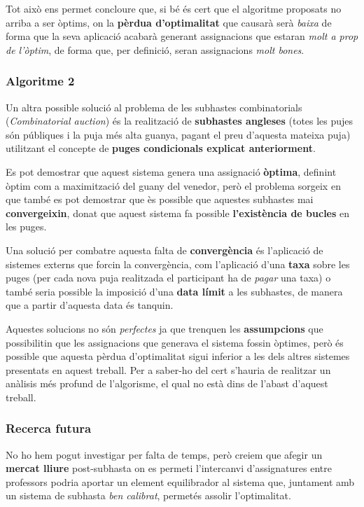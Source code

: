 \documentclass[10pt,twocolumn]{article}
\begin{document}
Tot això ens permet concloure que, si bé és cert que el algoritme proposats no arriba a ser òptims, on la \textbf{pèrdua d'optimalitat} que causarà serà \textit{baixa} de forma que la seva aplicació acabarà generant assignacions que estaran \textit{molt a prop de l'òptim}, de forma que, per definició, seran assignacions \textit{molt bones}.

\subsubsection{Algoritme 2}
Un altra possible solució al problema de les subhastes combinatorials (\textit{Combinatorial auction}) és la realització de \textbf{subhastes angleses} (totes les pujes són públiques i la puja més alta guanya, pagant el preu d'aquesta mateixa puja) utilitzant el concepte de \textbf{puges condicionals explicat anteriorment}.

Es pot demostrar que aquest sistema genera una assignació \textbf{òptima}, definint òptim com a maximització del guany del venedor, però el problema sorgeix en que també es pot demostrar que ès possible que aquestes subhastes mai \textbf{convergeixin}, donat que aquest sistema fa possible \textbf{l'existència de bucles} en les puges.

Una solució per combatre aquesta falta de \textbf{convergència} és l'aplicació de sistemes externs que forcin la convergència, com l'aplicació d'una \textbf{taxa} sobre les puges (per cada nova puja realitzada el participant ha de \textit{pagar} una taxa) o també seria possible la imposició d'una \textbf{data límit} a les subhastes, de manera que a partir d'aquesta data és tanquin.

Aquestes solucions no són \textit{perfectes} ja que trenquen les \textbf{assumpcions} que possibilitin que les assignacions que generava el sistema fossin òptimes, però és possible que aquesta pèrdua d'optimalitat sigui inferior a les dels altres sistemes presentats en aquest treball. Per a saber-ho del cert s'hauria de realitzar un anàlisis més profund de l'algorisme, el qual no està dins de l'abast d'aquest treball.

\subsubsection{Recerca futura}
No ho hem pogut investigar per falta de temps, però creiem que afegir un \textbf{mercat lliure} post-subhasta on es permeti l'intercanvi d'assignatures entre professors podria aportar un element equilibrador al sistema que, juntament amb un sistema de subhasta \textit{ben calibrat}, permetés assolir l'optimalitat.
\end{document}
